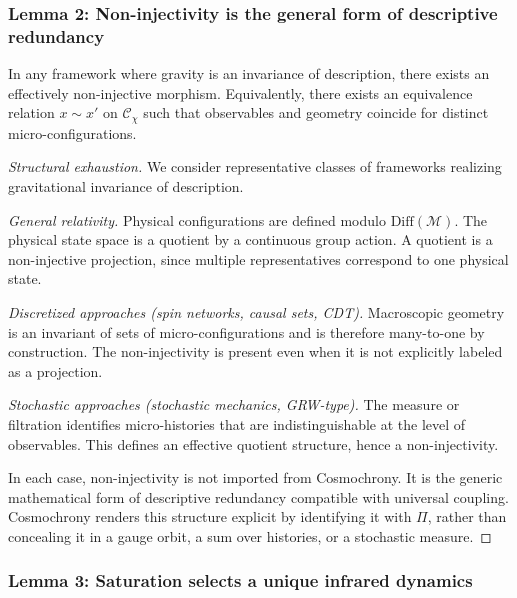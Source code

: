   \subsubsection*{Lemma 2: Non-injectivity is the general form of descriptive redundancy}
    \label{subsec:lemma2}

    \begin{lemma}
      \label{lem:redundancy-quotient}
      In any framework where gravity is an invariance of description,
      there exists an effectively non-injective morphism.
      Equivalently, there exists an equivalence relation $x \sim x'$ on $\mathcal{C}_\chi$
      such that observables and geometry coincide for distinct micro-configurations.
    \end{lemma}

    \begin{proof}[Structural exhaustion]
    We consider representative classes of frameworks realizing gravitational invariance of description.

    \textit{General relativity.}
    Physical configurations are defined modulo $\mathrm{Diff}(\mathcal{M})$.
    The physical state space is a quotient by a continuous group action.
    A quotient is a non-injective projection, since multiple representatives correspond to one physical state.

    \textit{Discretized approaches (spin networks, causal sets, CDT).}
    Macroscopic geometry is an invariant of sets of micro-configurations and is therefore many-to-one by construction.
    The non-injectivity is present even when it is not explicitly labeled as a projection.

    \textit{Stochastic approaches (stochastic mechanics, GRW-type).}
    The measure or filtration identifies micro-histories that are indistinguishable at the level of observables.
    This defines an effective quotient structure, hence a non-injectivity.

    In each case, non-injectivity is not imported from Cosmochrony.
    It is the generic mathematical form of descriptive redundancy compatible with universal coupling.
    Cosmochrony renders this structure explicit by identifying it with $\Pi$,
    rather than concealing it in a gauge orbit, a sum over histories, or a stochastic measure.
    \end{proof}

  \subsubsection*{Lemma 3: Saturation selects a unique infrared dynamics}
    \label{subsec:lemma3}

